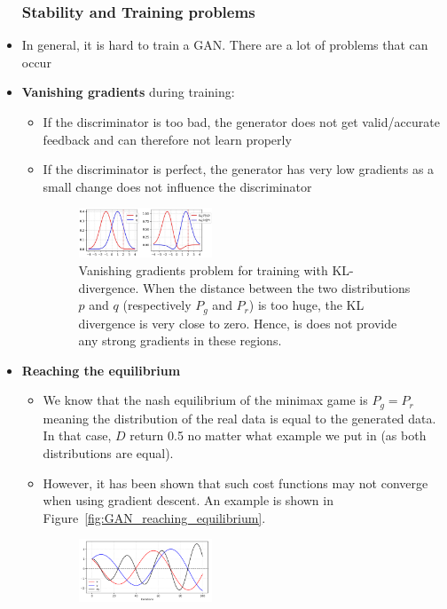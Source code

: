 \begin{itemize}
\subsubsection{Stability and Training problems}
	\item In general, it is hard to train a GAN. There are a lot of problems that can occur
	\item \textbf{Vanishing gradients} during training:
	\begin{itemize}
		\item If the discriminator is too bad, the generator does not get valid/accurate feedback and can therefore not learn properly
		\item If the discriminator is perfect, the generator has very low gradients as a small change does not influence the discriminator
		\begin{figure}[ht!]
			\centering
			\includegraphics[width=0.4\textwidth]{figures/cv_deep_learning_GAN_vanishing_gradients.jpeg}
			\caption{Vanishing gradients problem for training with KL-divergence. When the distance between the two distributions $p$ and $q$ (respectively $P_g$ and $P_r$) is too huge, the KL divergence is very close to zero. Hence, is does not provide any strong gradients in these regions.}
		\end{figure}
	\end{itemize}
	\item \textbf{Reaching the equilibrium}
	\begin{itemize}
		\item We know that the nash equilibrium of the minimax game is $P_g=P_r$ meaning the distribution of the real data is equal to the generated data. In that case, $D$ return 0.5 no matter what example we put in (as both distributions are equal).
		\item However, it has been shown that such cost functions may not converge when using gradient descent. An example is shown in Figure~\ref{fig:GAN_reaching_equilibrium}.
		\begin{figure}[ht!]
			\centering
			\includegraphics[width=0.4\textwidth]{figures/cv_deep_learning_GAN_oscillating.png}

\end{figure}
\end{itemize}
\end{itemize}
